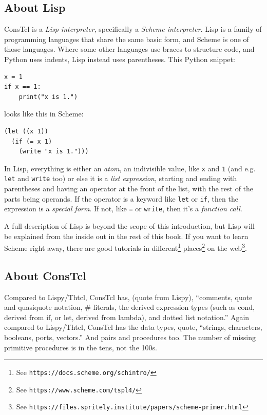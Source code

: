 \documentclass[a5paper,draft]{memoir}
\begin{document}
\subsection{About Lisp}
\label{about-lisp}

ConsTcl is a \emph{Lisp interpreter}, specifically a \emph{Scheme interpreter}.
Lisp is a family of programming languages that share the same basic form, and
Scheme is one of those languages. Where some other languages use braces to
structure code, and Python uses indents, Lisp instead uses parentheses. This
Python snippet:

\begin{verbatim}
x = 1
if x == 1:
    print("x is 1.")
\end{verbatim}

\noindent looks like this in Scheme:

\begin{verbatim}
(let ((x 1))
  (if (= x 1)
    (write "x is 1.")))
\end{verbatim}

In Lisp, everything is either an \emph{atom}, an indivisible value, like
\texttt{x} and \texttt{1} (and e.g. \texttt{let} and \texttt{write} too) or
else it is a \emph{list expression}, starting and ending with parentheses and
having an operator at the front of the list, with the rest of the parts being
operands. If the operator is a keyword like \texttt{let} or \texttt{if}, then
the expression is a \emph{special form}. If not, like \texttt{=} or
\texttt{write}, then it's a \emph{function call}.

A full description of Lisp is beyond the scope of this introduction, but Lisp
will be explained from the inside out in the rest of this book. If you want to
learn Scheme right away, there are good tutorials in
different\footnote{See \texttt{https://docs.scheme.org/schintro/}}
places\footnote{See \texttt{https://www.scheme.com/tspl4/}} on the
web\footnote{See
\texttt{https://files.spritely.institute/papers/scheme-primer.html}}.

\subsection{About ConsTcl}
\label{about-constcl}

Compared to Lispy/Thtcl, ConsTcl has, (quote from Lispy), ``comments, quote and
quasiquote notation, \# literals, the derived expression types (such as cond,
derived from if, or let, derived from lambda), and dotted list notation.''
Again compared to Lispy/Thtcl, ConsTcl has the data types, quote, ``strings,
characters, booleans, ports, vectors.'' And pairs and procedures too. The
number of missing primitive procedures is in the tens, not the 100s. 
\end{document}
